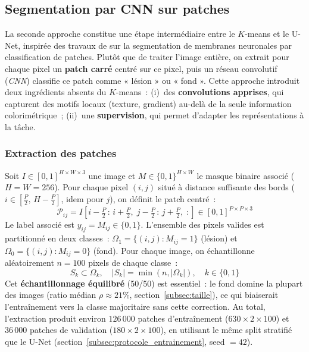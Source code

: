 \documentclass[12pt,a4paper]{article}
\begin{document}
\subsection{Segmentation par CNN sur patches}
\label{subsec:cnn_patch_methodo}

La seconde approche constitue une étape intermédiaire entre le $K$-means et le U-Net, inspirée des travaux de \citet{ciresan2012deep} sur la segmentation de membranes neuronales par classification de patches. Plutôt que de traiter l'image entière, on extrait pour chaque pixel un \textbf{patch carré} centré sur ce pixel, puis un réseau convolutif (\emph{CNN}) classifie ce patch comme « lésion » ou « fond ». Cette approche introduit deux ingrédients absents du $K$-means~: (i)~des \textbf{convolutions apprises}, qui capturent des motifs locaux (texture, gradient) au-delà de la seule information colorimétrique~; (ii)~une \textbf{supervision}, qui permet d'adapter les représentations à la tâche.

\subsubsection{Extraction des patches}

Soit $I \in [0, 1]^{H \times W \times 3}$ une image et $M \in \{0, 1\}^{H \times W}$ le masque binaire associé ($H = W = 256$). Pour chaque pixel $(i, j)$ situé à distance suffisante des bords ($i \in [\frac{P}{2},\, H - \frac{P}{2}]$, idem pour $j$), on définit le patch centré~:
\begin{equation}
    \mathcal{P}_{ij} = I\!\left[i - \tfrac{P}{2}\,:\,i + \tfrac{P}{2},\; j - \tfrac{P}{2}\,:\,j + \tfrac{P}{2},\; :\right] \in [0, 1]^{P \times P \times 3}
    \label{eq:patch}
\end{equation}
Le label associé est $y_{ij} = M_{ij} \in \{0, 1\}$. L'ensemble des pixels valides est partitionné en deux classes~: $\Omega_1 = \{(i,j) : M_{ij} = 1\}$ (lésion) et $\Omega_0 = \{(i,j) : M_{ij} = 0\}$ (fond). Pour chaque image, on échantillonne aléatoirement $n = 100$ pixels de chaque classe~:
\begin{equation}
    S_k \subset \Omega_k, \quad |S_k| = \min(n, |\Omega_k|), \quad k \in \{0, 1\}
    \label{eq:sampling}
\end{equation}
Cet \textbf{échantillonnage équilibré} (50/50) est essentiel~: le fond domine la plupart des images (ratio médian $\rho \approx 21\%$, section~\ref{subsec:taille}), ce qui biaiserait l'entraînement vers la classe majoritaire sans cette correction. Au total, l'extraction produit environ $126\,000$ patches d'entraînement ($630 \times 2 \times 100$) et $36\,000$ patches de validation ($180 \times 2 \times 100$), en utilisant le même split stratifié que le U-Net (section~\ref{subsec:protocole_entrainement}, seed $= 42$).
\end{document}
